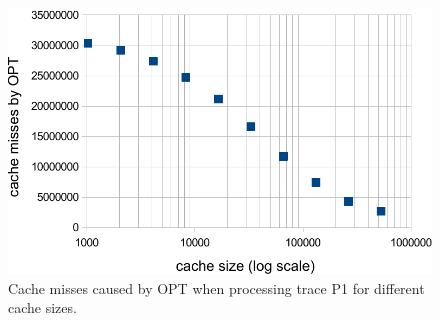 \documentclass[a4paper,12pt, titlepage]{article}  %
\begin{document}
\begin{figure}[p]
	\centering
	\includegraphics[scale=0.8]{./experiments/cacheMisses_P1.pdf}
	\caption{Cache misses caused by OPT when processing trace P1 for different cache sizes.} 
	\label{fig:cacheMisses_P1}
\end{figure}
\end{document}
